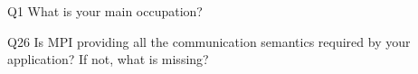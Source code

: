 \begin{description}%
\item{Q1} What is your main occupation?%
\item{Q26} Is MPI providing all the communication semantics required by your application? If not, what is missing?%
\end{description}%
